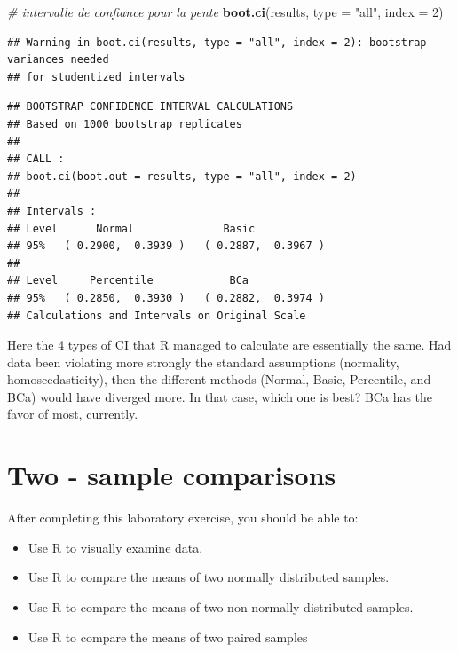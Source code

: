 \documentclass[
  12pt,
]{book}
\newenvironment{Shaded}{\begin{snugshade}}{\end{snugshade}}
\newcommand{\CommentTok}[1]{\textcolor[rgb]{0.56,0.35,0.01}{\textit{#1}}}
\newcommand{\DataTypeTok}[1]{\textcolor[rgb]{0.13,0.29,0.53}{#1}}
\newcommand{\DecValTok}[1]{\textcolor[rgb]{0.00,0.00,0.81}{#1}}
\newcommand{\KeywordTok}[1]{\textcolor[rgb]{0.13,0.29,0.53}{\textbf{#1}}}
\newcommand{\NormalTok}[1]{#1}
\newcommand{\StringTok}[1]{\textcolor[rgb]{0.31,0.60,0.02}{#1}}
\providecommand{\tightlist}{%
  \setlength{\itemsep}{0pt}\setlength{\parskip}{0pt}}
\begin{document}
\begin{Shaded}
\begin{Highlighting}[]
\CommentTok{\# intervalle de confiance pour la pente}
\KeywordTok{boot.ci}\NormalTok{(results, }\DataTypeTok{type =} \StringTok{"all"}\NormalTok{, }\DataTypeTok{index =} \DecValTok{2}\NormalTok{)}
\end{Highlighting}
\end{Shaded}

\begin{verbatim}
## Warning in boot.ci(results, type = "all", index = 2): bootstrap variances needed
## for studentized intervals
\end{verbatim}

\begin{verbatim}
## BOOTSTRAP CONFIDENCE INTERVAL CALCULATIONS
## Based on 1000 bootstrap replicates
## 
## CALL : 
## boot.ci(boot.out = results, type = "all", index = 2)
## 
## Intervals : 
## Level      Normal              Basic         
## 95%   ( 0.2900,  0.3939 )   ( 0.2887,  0.3967 )  
## 
## Level     Percentile            BCa          
## 95%   ( 0.2850,  0.3930 )   ( 0.2882,  0.3974 )  
## Calculations and Intervals on Original Scale
\end{verbatim}

Here the 4 types of CI that R managed to calculate are essentially the same. Had data been violating more strongly the standard assumptions (normality, homoscedasticity), then the different methods (Normal, Basic, Percentile, and BCa) would have diverged more. In that case, which one is best? BCa has the favor of most, currently.

\hypertarget{two---sample-comparisons}{%
\chapter{Two - sample comparisons}\label{two---sample-comparisons}}

After completing this laboratory exercise, you should be able to:

\begin{itemize}
\tightlist
\item
  Use R to visually examine data.
\item
  Use R to compare the means of two normally distributed samples.
\item
  Use R to compare the means of two non-normally distributed
  samples.
\item
  Use R to compare the means of two paired samples
\end{itemize}
\end{document}
